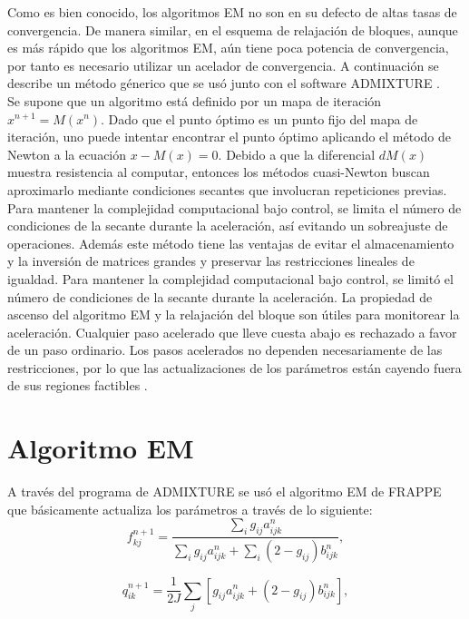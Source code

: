 Como es bien conocido, los algoritmos EM no son en su defecto de altas tasas de convergencia. De manera similar, en el esquema de relajaci\'on de bloques, aunque es m\'as r\'apido que los algoritmos EM, a\'un tiene poca potencia de convergencia, por tanto es necesario utilizar un acelador de convergencia. A continuaci\'on se describe un m\'etodo g\'enerico que se us\'o junto con el software ADMIXTURE \cite{}.\\

Se supone que un algoritmo est\'a definido por un mapa de iteraci\'on $x^{n+1} = M(x^{n})$. Dado que el punto \'optimo es un punto fijo del mapa de iteraci\'on, uno puede intentar encontrar el punto \'optimo aplicando el m\'etodo de Newton a la ecuaci\'on $x-M(x)=0$. Debido a que la diferencial $dM(x)$ muestra resistencia al computar, entonces los m\'etodos cuasi-Newton buscan aproximarlo mediante condiciones secantes que involucran repeticiones previas. Para mantener la complejidad computacional bajo control, se limita el n\'umero de condiciones de la secante durante la aceleraci\'on, as\'i evitando un sobreajuste de operaciones. Adem\'as este m\'etodo tiene las ventajas de evitar el almacenamiento y la inversión de matrices grandes y preservar las restricciones lineales de igualdad. Para mantener la complejidad computacional bajo control, se limit\'o el número de condiciones de la secante durante la aceleración. La propiedad de ascenso del algoritmo EM y la relajación del bloque son útiles para monitorear la aceleración. Cualquier paso acelerado que lleve cuesta abajo es rechazado a favor de un paso ordinario. Los pasos acelerados no dependen necesariamente de las restricciones, por lo que las actualizaciones de los parámetros están cayendo fuera de sus regiones factibles \cite{Zhou2011}.

\section{Algoritmo EM} \label{sec:EM}

A trav\'es del programa de ADMIXTURE se us\'o el algoritmo EM de FRAPPE que b\'asicamente actualiza los par\'ametros a trav\'es de lo siguiente: \\

\begin{equation}
  f_{kj}^{n+1} =  \frac{\sum_{i}g_{ij}a_{ijk}^{n}}{\sum_{i}g_{ij}a_{ijk}^{n} + \sum_{i}(2-g_{ij})b_{ijk}^{n}},
\end{equation}

\begin{equation}
  q_{ik}^{n+1} = \frac{1}{2J} \sum_{j}[g_{ij}a_{ijk}^{n} + (2-g_{ij})b_{ijk}^{n}],
\end{equation}

